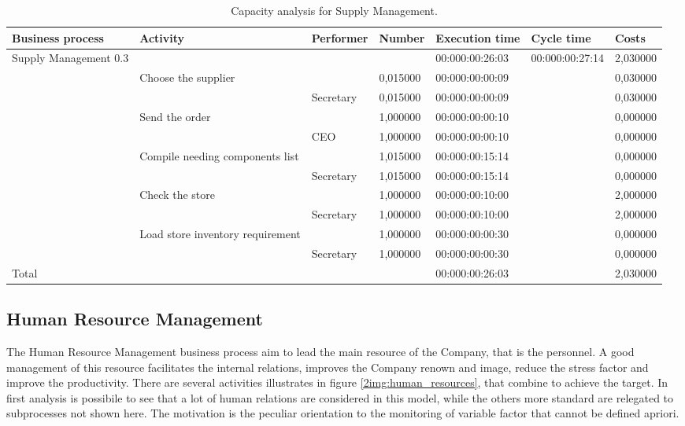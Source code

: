 \begin{landscape}
\begin{table}
\centering
{\tiny
\begin{tabular}{|l|l|l|l|l|l|l|}
Business process&Activity&Performer&Number&Execution time&Cycle time&Costs\\
\hline
Supply Management 0.3&&&&00:000:00:26:03&00:000:00:27:14&2,030000\\
\hline
&Choose the supplier &&0,015000&00:000:00:00:09&&0,030000\\
\hline
&&Secretary &0,015000&00:000:00:00:09&&0,030000\\
\hline
&Send the order &&1,000000&00:000:00:00:10&&0,000000\\
\hline
&&CEO &1,000000&00:000:00:00:10&&0,000000\\
\hline
&Compile needing components list &&1,015000&00:000:00:15:14&&0,000000\\
\hline
&&Secretary &1,015000&00:000:00:15:14&&0,000000\\
\hline
&Check the store &&1,000000&00:000:00:10:00&&2,000000\\
\hline
&&Secretary &1,000000&00:000:00:10:00&&2,000000\\
\hline
&Load store inventory requirement &&1,000000&00:000:00:00:30&&0,000000\\
\hline
&&Secretary &1,000000&00:000:00:00:30&&0,000000\\
\hline
Total&&&&00:000:00:26:03&&2,030000
\end{tabular}
}
\caption{Capacity analysis for Supply Management.}
\end{table}
\end{landscape}
%

%

\subsection{Human Resource Management}
The Human Resource Management business process aim to lead the main resource of the Company, that is the personnel. A good management of this resource facilitates the internal relations, improves the Company renown and image, reduce the stress factor and improve the productivity. There are several activities illustrates in figure \ref{2img:human_resources}, that combine to achieve the target. In first analysis is possibile to see that a lot of human relations are considered in this model, while the others more standard are relegated to subprocesses not shown here. The motivation is the peculiar orientation to the monitoring of variable factor that cannot be defined apriori.

